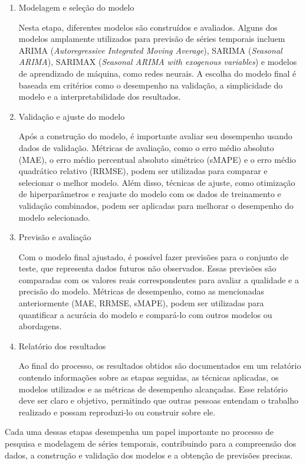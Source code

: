 \begin{enumerate}[start=1, label={\textbf{Etapa} \arabic*}]
	\item Modelagem e seleção do modelo\label{etp:5}
	
	Nesta etapa, diferentes modelos são construídos e avaliados. Alguns dos modelos amplamente utilizados para previsão de séries temporais incluem ARIMA (\textit{Autoregressive Integrated Moving Average}), SARIMA (\textit{Seasonal ARIMA}), SARIMAX (\textit{Seasonal ARIMA with exogenous variables}) e modelos de aprendizado de máquina, como redes neurais. A escolha do modelo final é baseada em critérios como o desempenho na validação, a simplicidade do modelo e a interpretabilidade dos resultados.
	
	\item Validação e ajuste do modelo\label{etp:6}
	
	Após a construção do modelo, é importante avaliar seu desempenho usando dados de validação. Métricas de avaliação, como o erro médio absoluto (MAE), o erro médio percentual absoluto simétrico (sMAPE) e o erro médio quadrático relativo (RRMSE), podem ser utilizadas para comparar e selecionar o melhor modelo. Além disso, técnicas de ajuste, como otimização de hiperparâmetros e reajuste do modelo com os dados de treinamento e validação combinados, podem ser aplicadas para melhorar o desempenho do modelo selecionado.
	
	\item Previsão e avaliação\label{etp:7}
	
	Com o modelo final ajustado, é possível fazer previsões para o conjunto de teste, que representa dados futuros não observados. Essas previsões são comparadas com os valores reais correspondentes para avaliar a qualidade e a precisão do modelo. Métricas de desempenho, como as mencionadas anteriormente (MAE, RRMSE, sMAPE), podem ser utilizadas para quantificar a acurácia do modelo e compará-lo com outros modelos ou abordagens.
	
	\item Relatório dos resultados\label{etp:9}
	
	Ao final do processo, os resultados obtidos são documentados em um relatório contendo informações sobre as etapas seguidas, as técnicas aplicadas, os modelos utilizados e as métricas de desempenho alcançadas. Esse relatório deve ser claro e objetivo, permitindo que outras pessoas entendam o trabalho realizado e possam reproduzi-lo ou construir sobre ele.
\end{enumerate}

Cada uma dessas etapas desempenha um papel importante no processo de pesquisa e modelagem de séries temporais, contribuindo para a compreensão dos dados, a construção e validação dos modelos e a obtenção de previsões precisas.


    